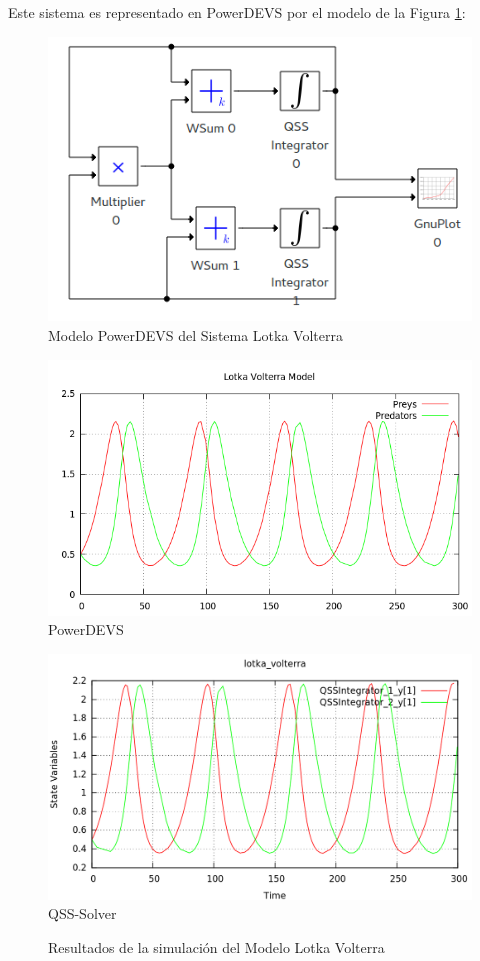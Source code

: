	Este sistema es representado en PowerDEVS por el modelo de la Figura \ref{model:lotka_volterra}:

\begin{figure}[H]
\includegraphics[width=0.75\linewidth]{lotka_voltera_pwd}
\caption{Modelo PowerDEVS del Sistema Lotka Volterra}
\label{model:lotka_volterra}
\end{figure}

\begin{figure}[H]
\centering
\begin{minipage}{0.5\textwidth}
\centering
 \includegraphics[width=\linewidth]{lotka_voltera-pd.png}
PowerDEVS \\
\end{minipage}\hfill
\begin{minipage}{0.5\textwidth}
\centering
 \includegraphics[width=\linewidth]{lotka_voltera-qss.png}
QSS-Solver \\
\end{minipage}
\label{graph:lotka_voltera}
\caption{Resultados de la simulación del Modelo Lotka Volterra}
\end{figure}

